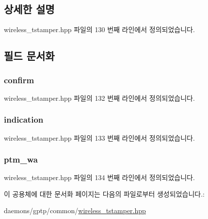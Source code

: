 \subsection{상세한 설명}


wireless\+\_\+tstamper.\+hpp 파일의 130 번째 라인에서 정의되었습니다.



\subsection{필드 문서화}
\subsubsection[{\texorpdfstring{confirm}{confirm}}]{ confirm}\hypertarget{union_time_sync_event_data_aadd0419ee3f299d785e1284b73c8db83}{}\label{union_time_sync_event_data_aadd0419ee3f299d785e1284b73c8db83}


wireless\+\_\+tstamper.\+hpp 파일의 132 번째 라인에서 정의되었습니다.

\subsubsection[{\texorpdfstring{indication}{indication}}]{ indication}\hypertarget{union_time_sync_event_data_a0258dde14ab92d18eb0381f186bd464f}{}\label{union_time_sync_event_data_a0258dde14ab92d18eb0381f186bd464f}


wireless\+\_\+tstamper.\+hpp 파일의 133 번째 라인에서 정의되었습니다.

\subsubsection[{\texorpdfstring{ptm\+\_\+wa}{ptm_wa}}]{ ptm\+\_\+wa}\hypertarget{union_time_sync_event_data_ab4125e6fe4a30fb6626b81a6a66b7413}{}\label{union_time_sync_event_data_ab4125e6fe4a30fb6626b81a6a66b7413}


wireless\+\_\+tstamper.\+hpp 파일의 134 번째 라인에서 정의되었습니다.



이 공용체에 대한 문서화 페이지는 다음의 파일로부터 생성되었습니다.\+:\begin{DoxyCompactItemize}
\item 
daemons/gptp/common/\hyperlink{wireless__tstamper_8hpp}{wireless\+\_\+tstamper.\+hpp}\end{DoxyCompactItemize}
